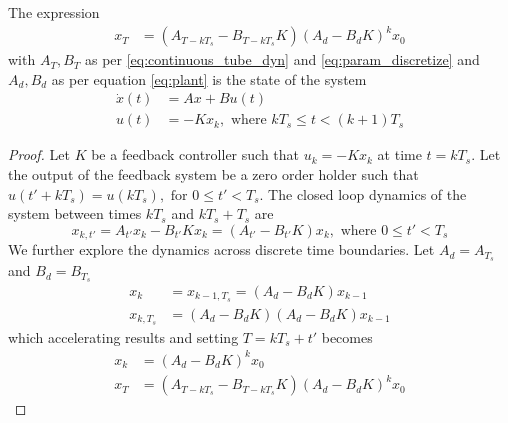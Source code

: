 \documentclass[a4paper,UKenglish]{lipics-v2018}
\newcommand{\mat}[1]{{#1}}
\renewcommand{\vec}[1]{{#1}}
\begin{document}
\begin{theorem}
The expression
 \begin{align}
 \vec{x}_{T} &= (\mat{A}_{T-kT_s}-\mat{B}_{T-kT_s}\mat{K}) (\mat{A}_d-\mat{B}_d\mat{K})^k\vec{x}_0
 \label{eq:cyber_feedback}
 \end{align}
 with $\mat{A}_T, \mat{B}_T$ as per \eqref{eq:continuous_tube_dyn} and \eqref{eq:param_discretize} and $\mat{A}_d, \mat{B}_d$ as per equation \eqref{eq:plant} is the state of the system
 \begin{align*}
 \dot{\vec{x}}({t}) &= \mat{A}\vec{x}+\mat{B}\vec{u}(t)\nonumber\\
 \vec{u}(t)&=-\mat{K}\vec{x}_k, \text{ where }  kT_s \leq t < (k+1)T_s
 \end{align*}
 \end{theorem}

\begin{proof}
%
Let $\mat{K}$ be a feedback controller such that
$\vec{u}_k=-\mat{K}\vec{x}_k$ at time $t=kT_s$.  Let the output of the
feedback system be a zero order holder such that
$\vec{u}(t'+kT_s)=\vec{u}(kT_s), \text{ for } 0 \leq t' < T_s$.  The closed
loop dynamics of the system between times $kT_s$ and $kT_s+T_s$ are
%
\begin{equation*}
\vec{x}_{k,t'}=\mat{A}_{t'}\vec{x}_k-\mat{B}_{t'}\mat{K}\vec{x}_k = (\mat{A}_{t'}-\mat{B}_{t'}\mat{K})\vec{x}_k, \text{ where }  0 \leq t' < T_s
\end{equation*}
We further explore the dynamics across discrete time boundaries. Let $\mat{A}_d=\mat{A}_{T_s}$ and $\mat{B}_d=\mat{B}_{T_s}$
\begin{align*}
\vec{x}_{k}&=\vec{x}_{k-1,T_s}= (\mat{A}_d-\mat{B}_d\mat{K})\vec{x}_{k-1}\\
\vec{x}_{k,T_s} &= (\mat{A}_d-\mat{B}_d\mat{K}) (\mat{A}_d-\mat{B}_d\mat{K})\vec{x}_{k-1}
\end{align*}
which accelerating results and setting $T=kT_s+t'$ becomes
\begin{align}
\label{eq:feedback_sampled_cont}
\vec{x}_{k} &= (\mat{A}_d-\mat{B}_d\mat{K}) ^k\vec{x}_0\\
\vec{x}_{T} &= (\mat{A}_{T-kT_s}-\mat{B}_{T-kT_s}\mat{K}) (\mat{A}_d-\mat{B}_d\mat{K})^k\vec{x}_0
\label{eq:feedback_cont}
\end{align}
\end{proof}

\end{document}
